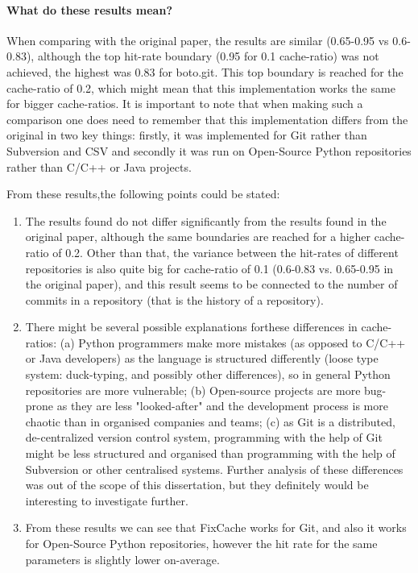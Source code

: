 \documentclass[12pt,twoside,notitlepage]{report}
\newcommand{\fxch}{FixCache }
\begin{document}
\paragraph{What do these results mean?} When comparing with the original paper, the results are similar (0.65-0.95 vs 0.6-0.83), although the top hit-rate boundary (0.95 for 0.1 cache-ratio) was not achieved, the highest was 0.83 for boto.git. This top boundary is reached for the cache-ratio of 0.2, which might mean that this implementation works the same for bigger cache-ratios. It is important to note that when making such a comparison one does need to remember that this implementation differs from the original in two key things: firstly, it was implemented for Git rather than Subversion and CSV and secondly it was run on Open-Source Python repositories rather than C/C++ or Java projects. 

From these results,the following points could be stated:
\begin{enumerate}
\item The results found do not differ significantly from the results found in the original paper, although the same boundaries are reached for a higher cache-ratio of 0.2. Other than that, the variance between the hit-rates of different repositories is also quite big for cache-ratio of 0.1 (0.6-0.83 vs. 0.65-0.95 in the original paper), and this result seems to be connected to the number of commits in a repository (that is the history of a repository).
\item There might be several possible explanations forthese differences in cache-ratios: (a) Python programmers make more mistakes (as opposed to C/C++ or Java developers) as the language is structured differently (loose type system: duck-typing, and possibly other differences), so in general Python repositories are more vulnerable; (b) Open-source projects are more bug-prone as they are less "looked-after" and the development process is more chaotic than in organised companies and teams; (c) as Git is a distributed, de-centralized version control system, programming with the help of Git might be less structured and organised than programming with the help of Subversion or other centralised systems. Further analysis of these differences was out of the scope of this dissertation, but they definitely would be interesting to investigate further.
\item From these results we can see that \fxch works for Git, and also it works for Open-Source Python repositories, however the hit rate for the same parameters is slightly lower on-average.
\end{enumerate}
\end{document}
